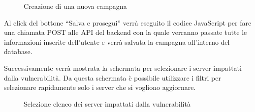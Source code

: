 \begin{figure}[H]
\begin{flushright}
    \centering
    \caption{Creazione di una nuova campagna}
    \label{fig:Creazione di una nuova campagna}
\end{flushright}
\end{figure}

Al click del bottone “Salva e prosegui” verrà eseguito il codice JavaScript per 
fare una chiamata POST alle API del backend con la quale verranno passate tutte le 
informazioni inserite dell’utente e verrà salvata la campagna all’interno del 
database.

Successivamente verrà mostrata la schermata per selezionare i server impattati 
dalla vulnerabilità. Da questa schermata è possibile utilizzare i filtri per 
selezionare rapidamente solo i server che si vogliono aggiornare.

\begin{figure}[H]
\begin{flushright}
    \centering
    \caption{Selezione elenco dei server impattati dalla vulnerabilità}
    \label{fig:Selezione elenco dei server impattati dalla vulnerabilità}
\end{flushright}
\end{figure}

